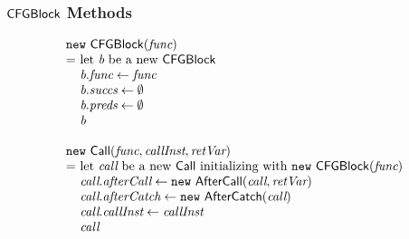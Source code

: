 \subsubsection{$\mbox{\textsf{CFGBlock}}$ Methods}
\[
\begin{array}{l@{}l@{~}l}
\lefteqn{\new\ \CFGBlock(\emph{func})}\\
& = & \text{let } \emph{b} \text{ be a new } \CFGBlock\\
& & \emph{b}.\emph{func} \leftarrow \emph{func}\\
& & \emph{b}.\emph{succs} \leftarrow \emptyset\\
& & \emph{b}.\emph{preds} \leftarrow \emptyset\\
& & \emph{b}\\
& & \\

\lefteqn{\new\ \Call(\emph{func}, \emph{callInst}, \emph{retVar})}\\
& = & \text{let } \emph{call} \text{ be a new } \Call \text{ initializing with } \new\ \CFGBlock(\emph{func})\\
& & \emph{call}.\emph{afterCall} \leftarrow \new\ \AfterCall(\emph{call}, \emph{retVar})\\
& & \emph{call}.\emph{afterCatch} \leftarrow \new\ \AfterCatch(\emph{call})\\
& & \emph{call}.\emph{callInst} \leftarrow \emph{callInst}\\
& & \emph{call}\\
& & \\
\end{array}
\]

